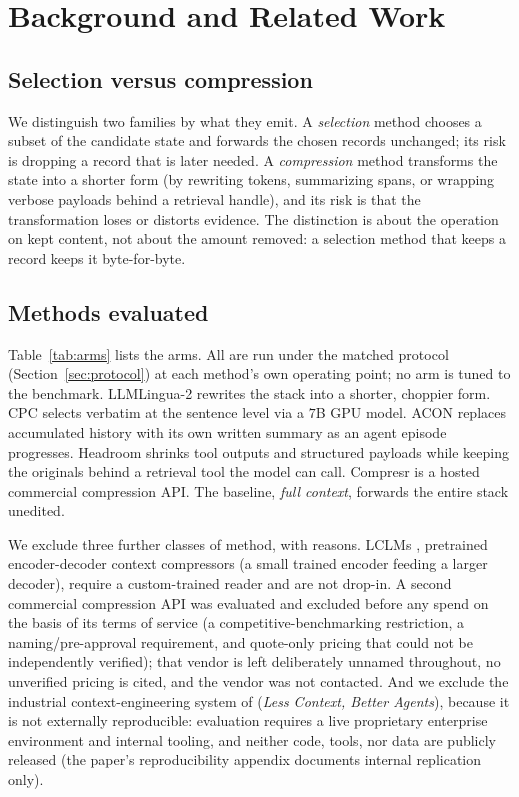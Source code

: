 \documentclass[11pt]{article}
\begin{document}
\section{Background and Related Work}
\label{sec:background}

\subsection{Selection versus compression}

We distinguish two families by what they emit. A \emph{selection} method chooses a subset of the
candidate state and forwards the chosen records unchanged; its risk is dropping a record that is
later needed. A \emph{compression} method transforms the state into a shorter form (by
rewriting tokens, summarizing spans, or wrapping verbose payloads behind a retrieval handle),
and its risk is that the transformation loses or distorts evidence. The distinction is about
the operation on kept content, not about the amount removed: a selection method that keeps a
record keeps it byte-for-byte.

\subsection{Methods evaluated}

Table~\ref{tab:arms} lists the arms. All are run under the matched protocol
(Section~\ref{sec:protocol}) at each method's own operating point; no arm is tuned to the
benchmark. LLMLingua-2 \citep{pan2024llmlingua2} rewrites the stack into a shorter, choppier
form. CPC \citep{liskavets2025cpc} selects verbatim at the sentence level via a $7$B GPU model.
ACON \citep{acon2025} replaces accumulated history with its own written summary as an agent
episode progresses. Headroom \citep{headroom} shrinks tool outputs and structured payloads while
keeping the originals behind a retrieval tool the model can call. Compresr \citep{compresr} is a
hosted commercial compression API. The baseline, \emph{full context}, forwards the entire stack
unedited.

We exclude three further classes of method, with reasons. LCLMs \citep{li2026lclm}, pretrained
encoder-decoder context compressors (a small trained encoder feeding a larger decoder), require a
custom-trained reader and are not drop-in. A second commercial compression API was evaluated and
excluded before any spend on the basis of its terms of service (a competitive-benchmarking
restriction, a naming/pre-approval requirement, and quote-only pricing that could not be
independently verified); that vendor is left deliberately unnamed throughout, no unverified pricing
is cited, and the vendor was not contacted. And we exclude the industrial context-engineering system
of \citet{lodha2026lcba} (\emph{Less Context, Better Agents}), because it is not externally
reproducible: evaluation requires a live proprietary enterprise environment and internal tooling, and
neither code, tools, nor data are publicly released (the paper's reproducibility appendix documents
internal replication only).
\end{document}

